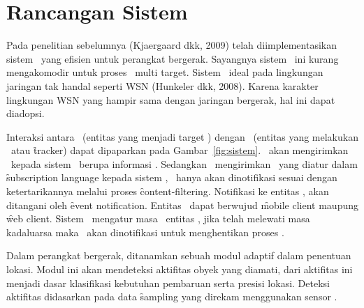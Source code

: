 

\section{Rancangan Sistem}

Pada penelitian sebelumnya (Kjaergaard dkk, 2009) telah diimplementasikan
sistem \tracking~yang efisien untuk perangkat bergerak. Sayangnya sistem
\tracking~ini kurang mengakomodir untuk proses \tracking~multi target. Sistem
\pubsub~ideal pada lingkungan jaringan tak handal seperti WSN (Hunkeler dkk,
2008). Karena karakter lingkungan WSN yang hampir sama dengan jaringan
bergerak, hal ini dapat diadopsi. 

Interaksi antara \publisher~(entitas yang menjadi target \tracking) dengan
\subscriber~(entitas yang melakukan \tracking~atau \f{tracker}) dapat dipaparkan pada
Gambar~\ref{fig:sistem}.  \Publisher~akan mengirimkan \event~kepada sistem
\pubsub~berupa informasi \tracking.  Sedangkan \subscriber~mengirimkan
\subscription~yang diatur dalam \f{subscription language} kepada sistem
\pubsub, \subscriber~hanya akan dinotifikasi sesuai dengan ketertarikannya
melalui proses \f{content-filtering}. Notifikasi ke entitas \subscriber, akan
ditangani oleh \f{event notification}. Entitas \subscriber~dapat berwujud
\f{mobile client} maupung \f{web client}. Sistem \pubsub~mengatur masa
\subscription~entitas \subscriber, jika telah melewati masa kadaluarsa maka
\publisher~akan dinotifikasi untuk menghentikan proses \publish.

Dalam perangkat bergerak, ditanamkan sebuah modul adaptif dalam penentuan
lokasi.  Modul ini akan mendeteksi aktifitas obyek yang diamati, dari aktifitas
ini menjadi dasar klasifikasi kebutuhan pembaruan serta presisi lokasi. Deteksi
aktifitas didasarkan pada data \f{sampling} yang direkam menggunakan sensor
\acc.


